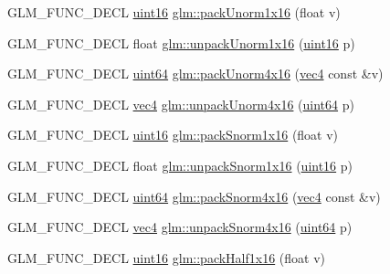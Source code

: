 \begin{DoxyCompactItemize}
\item 
G\+L\+M\+\_\+\+F\+U\+N\+C\+\_\+\+D\+E\+CL \hyperlink{group__gtc__type__precision_gad8c2939e1fdd8e5828b31d95c52255d5}{uint16} \hyperlink{group__gtc__packing_ga60c7d915f5653559ae02c2f79a8c5c1d}{glm\+::pack\+Unorm1x16} (float v)
\item 
G\+L\+M\+\_\+\+F\+U\+N\+C\+\_\+\+D\+E\+CL float \hyperlink{group__gtc__packing_ga7770e3ade4f4764cc1b2eb42ac4ec188}{glm\+::unpack\+Unorm1x16} (\hyperlink{group__gtc__type__precision_gad8c2939e1fdd8e5828b31d95c52255d5}{uint16} p)
\item 
G\+L\+M\+\_\+\+F\+U\+N\+C\+\_\+\+D\+E\+CL \hyperlink{group__gtc__type__precision_gae3632bf9b37da66233d78930dd06378a}{uint64} \hyperlink{group__gtc__packing_gac561f06c908b7302537a8ef29fcb409e}{glm\+::pack\+Unorm4x16} (\hyperlink{group__core__types_ga5881b1b022d7fd1b7218f5916532dd02}{vec4} const \&v)
\item 
G\+L\+M\+\_\+\+F\+U\+N\+C\+\_\+\+D\+E\+CL \hyperlink{group__core__types_ga5881b1b022d7fd1b7218f5916532dd02}{vec4} \hyperlink{group__gtc__packing_gafb2b502bc406031a5618ce930139a9e3}{glm\+::unpack\+Unorm4x16} (\hyperlink{group__gtc__type__precision_gae3632bf9b37da66233d78930dd06378a}{uint64} p)
\item 
G\+L\+M\+\_\+\+F\+U\+N\+C\+\_\+\+D\+E\+CL \hyperlink{group__gtc__type__precision_gad8c2939e1fdd8e5828b31d95c52255d5}{uint16} \hyperlink{group__gtc__packing_gac29411d6c0f6ed0fe9f0396dfe92e0e8}{glm\+::pack\+Snorm1x16} (float v)
\item 
G\+L\+M\+\_\+\+F\+U\+N\+C\+\_\+\+D\+E\+CL float \hyperlink{group__gtc__packing_ga246f451cebf590726324f7a283e3d65e}{glm\+::unpack\+Snorm1x16} (\hyperlink{group__gtc__type__precision_gad8c2939e1fdd8e5828b31d95c52255d5}{uint16} p)
\item 
G\+L\+M\+\_\+\+F\+U\+N\+C\+\_\+\+D\+E\+CL \hyperlink{group__gtc__type__precision_gae3632bf9b37da66233d78930dd06378a}{uint64} \hyperlink{group__gtc__packing_ga9b237d7c66b7a71964e6d1f4dc06539f}{glm\+::pack\+Snorm4x16} (\hyperlink{group__core__types_ga5881b1b022d7fd1b7218f5916532dd02}{vec4} const \&v)
\item 
G\+L\+M\+\_\+\+F\+U\+N\+C\+\_\+\+D\+E\+CL \hyperlink{group__core__types_ga5881b1b022d7fd1b7218f5916532dd02}{vec4} \hyperlink{group__gtc__packing_ga1bfaa3f217fd7a4b6b9d3117ecb3fcac}{glm\+::unpack\+Snorm4x16} (\hyperlink{group__gtc__type__precision_gae3632bf9b37da66233d78930dd06378a}{uint64} p)
\item 
G\+L\+M\+\_\+\+F\+U\+N\+C\+\_\+\+D\+E\+CL \hyperlink{group__gtc__type__precision_gad8c2939e1fdd8e5828b31d95c52255d5}{uint16} \hyperlink{group__gtc__packing_gaba534b320836a35372e00af5771dd1a2}{glm\+::pack\+Half1x16} (float v)

\end{DoxyCompactItemize}
